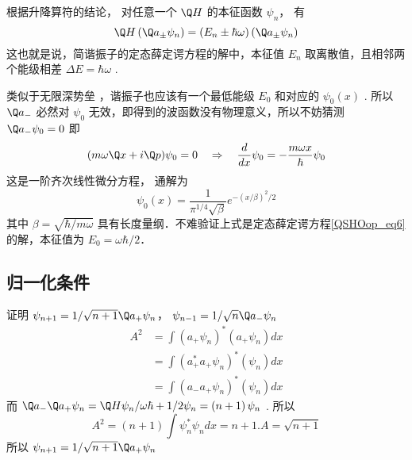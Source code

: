 根据升降算符的结论，%
对任意一个 $\Q H$ 的本征函数 ${\psi _n}$， 有
\begin{equation}
  \Q H\left( {{{\Q a}_ \pm }{\psi _n}} \right) = \left( {{E_n} \pm \hbar \omega } \right)\left( {{{\Q a}_ \pm }{\psi _n}} \right)
\end{equation}
这也就是说，简谐振子的定态薛定谔方程的解中，本征值 ${E_n}$ 取离散值，且相邻两个能级相差 $\Delta E = \hbar \omega $ . 

类似于无限深势垒%
，谐振子也应该有一个最低能级 ${E_0}$ 和对应的 ${\psi _0}\left( x \right)$ . 所以 ${\Q a_ - }$ 必然对 ${\psi _0}$ 无效，即得到的波函数没有物理意义，所以不妨猜测 ${\Q a_ - }{\psi _0} = 0$ 
即
\begin{equation}
(m\omega \Q x + i\Q p){\psi _0} = 0
\quad \Rightarrow \quad
\frac{d}{{dx}}{\psi _0} =  - \frac{{m\omega x}}{\hbar }{\psi _0}
\end{equation}
这是一阶齐次线性微分方程，%
通解为
\begin{equation}
{\psi _0}(x) = \frac{1}{{{\pi ^{1/4}}\sqrt \beta  }}{e^{ - {{(x/\beta )}^2}/2}}
\end{equation}
其中 $\beta = \sqrt {\hbar /m\omega }$ 具有长度量纲．不难验证上式是定态薛定谔方程\autoref{QSHOop_eq6} 的解，本征值为 $E_0=\omega\hbar/2$．


\subsection{归一化条件}


证明 ${\psi _{n + 1}} = {1}/{{\sqrt {n + 1} }}{\Q a_ + }{\psi _n}$，  ${\psi _{n - 1}} = {1}/{{\sqrt n }}{\Q a_ - }{\psi _n}$ 
\begin{equation}
\begin{aligned}
  {A^2} & = \int {{{\left( {{a_ + }{\psi _n}} \right)}^*}\left( {{a_ + }{\psi _n}} \right)dx} \\
   & = \int {{{\left( {a_ + ^*{a_ + }{\psi _n}} \right)}^*}\left( {{\psi _n}} \right)dx}  \\
   & = \int {{{\left( {{a_ - }{a_ + }{\psi _n}} \right)}^*}\left( {{\psi _n}} \right)dx}
\end{aligned}
\end{equation}
而 ${\Q a_ - }{\Q a_ + }{\psi _n} = {{\Q H{\psi _n}}}/{{\omega \hbar }} + {1}/{2}{\psi _n} = \left( {n + 1} \right){\psi _n}$ . 所以
\begin{equation}
  {A^2} = \left( {n + 1} \right)\int {\psi _n^*{\psi _n}dx}  = n + 1. A = \sqrt {n + 1}
\end{equation}
所以 ${\psi _{n + 1}} = {1}/{{\sqrt {n + 1} }}{\Q a_ + }{\psi _n}$

